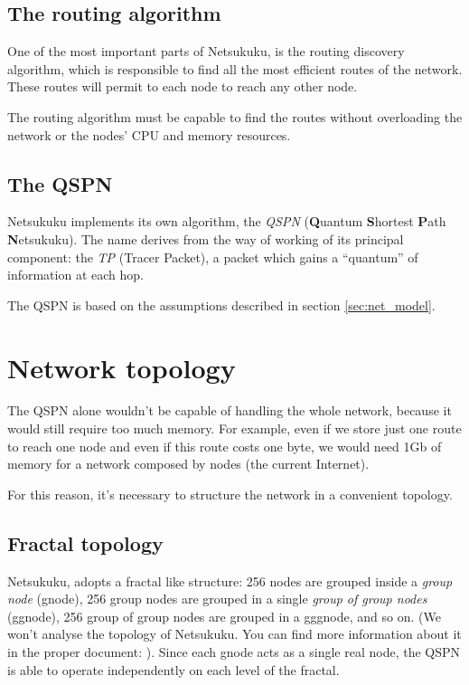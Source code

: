 \documentclass[a4paper]{article}
\begin{document}
\subsection{The routing algorithm}
One of the most important parts of Netsukuku, is the routing discovery
algorithm, which is responsible to find all the most efficient routes of the
network. These routes will permit to each node to reach any other node.

The routing algorithm must be capable to find the routes without overloading
the network or the nodes' CPU and memory resources.

\subsection{The QSPN}

Netsukuku implements its own algorithm, the \emph{QSPN} (\textbf{Q}uantum
\textbf{S}hortest \textbf{P}ath \textbf{N}etsukuku). The name derives from the
way of working of its principal component: the \emph{TP} (Tracer Packet), a
packet which gains a ``quantum'' of information at each hop.

The QSPN is based on the assumptions described in section \ref{sec:net_model}.

\section{Network topology}
\label{sec:net_topology}

The QSPN alone wouldn't be capable of handling the whole network, because it
would still require too much memory. For example, even if we store just one
route to reach one node and even if this route costs one byte, we would need
1Gb of memory for a network composed by  nodes (the current Internet).

For this reason, it's necessary to structure the network in a convenient
topology.

\subsection{Fractal topology}
\label{sec:fractal_topology}
Netsukuku, adopts a fractal like structure:
256 nodes are grouped inside a \emph{group node} (gnode), 256 group nodes are grouped
in a single \emph{group of group nodes} (ggnode), 256 group of group nodes are
grouped in a gggnode, and so on.
(We won't analyse the topology of Netsukuku. You can find more information
about it in the proper document: \cite{ntktopology}).
\newline
Since each gnode acts as a single real node,
the QSPN is able to operate independently on each level of the fractal.
\end{document}
